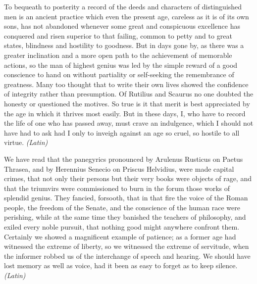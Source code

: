 

To bequeath to posterity a record of the deeds and characters of distinguished men is an ancient practice which even the present age, careless as it is of its own sons, has not abandoned whenever some great and conspicuous excellence has conquered and risen superior to that failing, common to petty and to great states, blindness and hostility to goodness. But in days gone by, as there was a greater inclination and a more open path to the achievement of memorable actions, so the man of highest genius was led by the simple reward of a good conscience to hand on without partiality or self-seeking the remembrance of greatness. Many too thought that to write their own lives showed the confidence of integrity rather than presumption. Of Rutilius and Scaurus no one doubted the honesty or questioned the motives. So true is it that merit is best appreciated by the age in which it thrives most easily. But in these days, I, who have to record the life of one who has passed away, must crave an indulgence, which I should not have had to ask had I only to inveigh against an age so cruel, so hostile to all virtue. \emph{(Latin)}


We have read that the panegyrics pronounced by Arulenus Rusticus on Paetus Thrasea, and by Herennius Senecio on Priscus Helvidius, were made capital crimes, that not only their persons but their very books were objects of rage, and that the triumvirs were commissioned to burn in the forum those works of splendid genius. They fancied, forsooth, that in that fire the voice of the Roman people, the freedom of the Senate, and the conscience of the human race were perishing, while at the same time they banished the teachers of philosophy, and exiled every noble pursuit, that nothing good might anywhere confront them. Certainly we showed a magnificent example of patience; as a former age had witnessed the extreme of liberty, so we witnessed the extreme of servitude, when the informer robbed us of the interchange of speech and hearing. We should have lost memory as well as voice, had it been as easy to forget as to keep silence. \emph{(Latin)}


